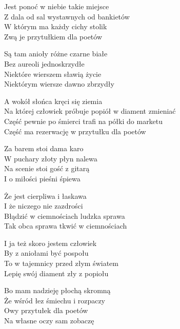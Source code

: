 \begin{text}
    Jest ponoć w niebie takie miejsce\\
    Z dala od sal wystawnych od bankietów\\
    W którym ma każdy cichy stolik\\
    Zwą je przytułkiem dla poetów

    Są tam anioły różne czarne białe\\
    Bez aureoli jednoskrzydłe\\
    Niektóre wierszem sławią życie\\
    Niektórym wiersze dawno zbrzydły

    \vin A wokół słońca kręci się ziemia\\
    \vin Na której człowiek próbuje popiół w diament zmieniać\\
    \vin Część pewnie po śmierci trafi na półki do marketu\\
    \vin Część ma rezerwację w przytułku dla poetów

    Za barem stoi dama karo\\
    W puchary złoty płyn nalewa\\
    Na scenie stoi gość z gitarą\\
    I o miłości pieśni śpiewa

    Że jest cierpliwa i łaskawa\\
    I że niczego nie zazdrości\\
    Błądzić w ciemnościach ludzka sprawa\\
    Tak obca sprawa tkwić w ciemnościach

    I ja też skoro jestem człowiek\\
    By z aniołami być pospołu\\
    To w tajemnicy przed złym światem\\
    Lepię swój diament zły z popiołu

    Bo mam nadzieję płochą skromną\\
    Że wśród łez śmiechu i rozpaczy\\
    Owy przytułek dla poetów\\
    Na własne oczy sam zobaczę
\end{text}
\begin{chord}

\end{chord}